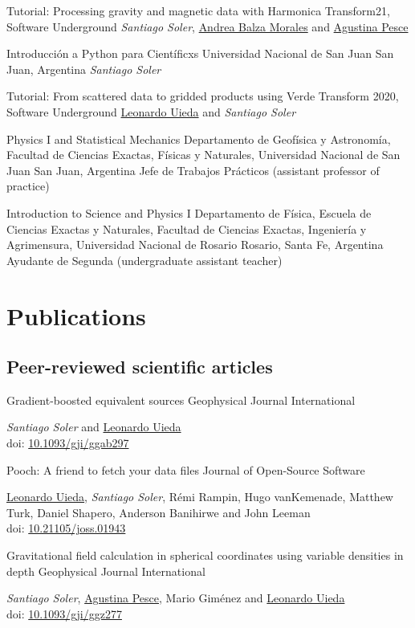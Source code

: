 \documentclass[a4paper,12pt]{moderncv}
\newcommand{\me}{\emph{Santiago Soler}}
\newcommand{\agustina}{\href{https://aguspesce.github.io}{Agustina Pesce}}
\newcommand{\andrea}{\href{https://www.andreabalza.com/}{Andrea Balza Morales}}
\newcommand{\leo}{\href{https://www.leouieda.com}{Leonardo Uieda}}
\newcommand{\mario}{Mario Giménez}
\newcommand{\remirampin}{Rémi Rampin}
\newcommand{\hugovankemenade}{Hugo vanKemenade}
\newcommand{\matthewturk}{Matthew Turk}
\newcommand{\danshapero}{Daniel Shapero}
\newcommand{\andersonbanihirwe}{Anderson Banihirwe}
\newcommand{\johnleeman}{John Leeman}
\newcommand{\doi}[1]{
    \href{https://doi.org/#1}{#1}
}
\begin{document}
{Tutorial: Processing gravity and magnetic data with Harmonica}
{Transform21, Software Underground}
{} %
{} %
{\me{}, \andrea{} and \agustina{}} %

{Introducción a Python para Científicxs} %
{Universidad Nacional de San Juan} %
{San Juan, Argentina} %
{} %
{\me{}} %

{Tutorial: From scattered data to gridded products using Verde}
{Transform 2020, Software Underground}
{}
{}
{\leo{} and \me{}}

{Physics I and Statistical Mechanics}
{
    Departamento de Geofísica y Astronomía,
    Facultad de Ciencias Exactas, Físicas y Naturales,
    Universidad Nacional de San Juan
}
{San Juan, Argentina}
{}
{Jefe de Trabajos Prácticos (assistant professor of practice)}

{Introduction to Science and Physics I}
{
    Departamento de Física,
    Escuela de Ciencias Exactas y Naturales,
    Facultad de Ciencias Exactas, Ingeniería y Agrimensura,
    Universidad Nacional de Rosario
}
{Rosario, Santa Fe, Argentina}
{}
{Ayudante de Segunda (undergraduate assistant teacher)}


\section{Publications}

\subsection{Peer-reviewed scientific articles}

{Gradient-boosted equivalent sources}
{Geophysical Journal International}
{}
{}
{
    \me{} and \leo{}
    \\
    doi: \doi{10.1093/gji/ggab297}
}

{Pooch: A friend to fetch your data files}
{Journal of Open-Source Software}
{}
{}
{
    \leo{}, \me{}, \remirampin{}, \hugovankemenade{}, \matthewturk{},
    \danshapero{}, \andersonbanihirwe{} and \johnleeman{}
    \\
    doi: \doi{10.21105/joss.01943}
}

{
    Gravitational field calculation in spherical coordinates using variable
    densities in depth
}
{Geophysical Journal International}
{}
{}
{
    \me{}, \agustina{}, \mario{} and \leo{}
    \\
    doi: \doi{10.1093/gji/ggz277}
}
\end{document}
